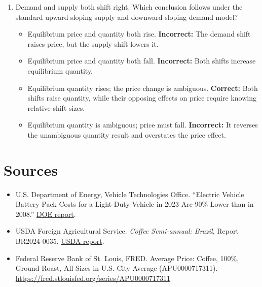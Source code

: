 \documentclass[11pt,letterpaper]{article}
\begin{document}
\begin{enumerate}
    \item Demand and supply both shift right. Which conclusion follows under the standard upward-sloping supply and downward-sloping demand model?
    \begin{itemize}
        \item[A.] Equilibrium price and quantity both rise. \textbf{Incorrect:} The demand shift raises price, but the supply shift lowers it.
        \item[B.] Equilibrium price and quantity both fall. \textbf{Incorrect:} Both shifts increase equilibrium quantity.
        \item[C.] Equilibrium quantity rises; the price change is ambiguous. \textbf{Correct:} Both shifts raise quantity, while their opposing effects on price require knowing relative shift sizes.
        \item[D.] Equilibrium quantity is ambiguous; price must fall. \textbf{Incorrect:} It reverses the unambiguous quantity result and overstates the price effect.
    \end{itemize}
\end{enumerate}

\section*{Sources}
\begin{itemize}
    \item U.S. Department of Energy, Vehicle Technologies Office. “Electric Vehicle Battery Pack Costs for a Light-Duty Vehicle in 2023 Are 90\% Lower than in 2008.” \href{https://www.energy.gov/cmei/vehicles/articles/fotw-1354-august-5-2024-electric-vehicle-battery-pack-costs-light-duty}{DOE report}.
    \item USDA Foreign Agricultural Service. \emph{Coffee Semi-annual: Brazil}, Report BR2024-0035. \href{https://apps.fas.usda.gov/newgainapi/api/Report/DownloadReportByFileName?fileName=Coffee+Semi-annual_Brasilia_Brazil_BR2024-0035.pdf}{USDA report}.
    \item Federal Reserve Bank of St. Louis, FRED. Average Price: Coffee, 100\%, Ground Roast, All Sizes in U.S. City Average (APU0000717311). \url{https://fred.stlouisfed.org/series/APU0000717311}
\end{itemize}
\end{document}
